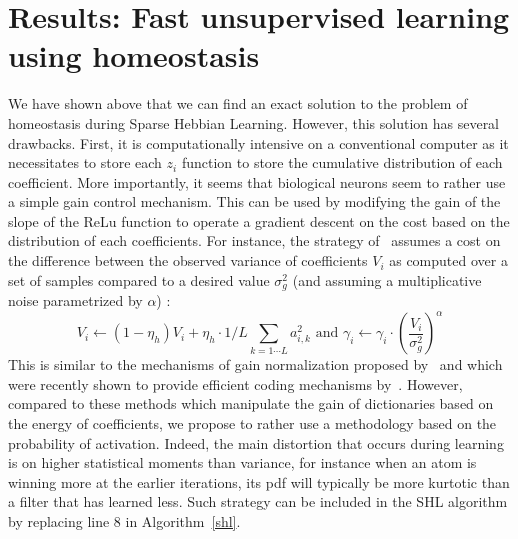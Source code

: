 \documentclass[draft]{article} %
\newcommand{\seeFig}[1]{Figure~\ref{fig:#1}}%
\begin{document}
\section{Results: Fast unsupervised learning using homeostasis}\label{results}
We have shown above that we can find an exact solution to the problem of homeostasis during Sparse Hebbian Learning. However, this solution has several drawbacks. First, it is computationally intensive on a conventional computer as it necessitates to store each $z_i$ function to store the cumulative distribution of each coefficient. More importantly, it seems that biological neurons seem to rather use a simple gain control mechanism. This can be used by modifying the gain of the slope of the ReLu function to operate a gradient descent on the cost based on the distribution of each coefficients. For instance, the strategy of~\citep{Olshausen97} assumes a cost on the difference between the observed variance of coefficients $V_i$ as computed over a set of samples compared to a desired value $\sigma_g^2$ (and assuming a multiplicative noise parametrized by $\alpha$) :
\begin{equation}%
V_i \leftarrow (1- \eta_h ) V_i + \eta_h \cdot 1/L\sum_{k=1\cdots L} a_{i, k}^2 \textrm{ and }
\gamma_i \leftarrow \gamma_i \cdot \left( \frac{V_i}{\sigma_g^2} \right)^\alpha
\end{equation}%
This is similar to the mechanisms of gain normalization proposed by~\citep{Schwartz01} and which were recently shown to provide efficient coding mechanisms by~\citep{Simoncelli17}. However, compared to these methods which manipulate the gain of dictionaries based on the energy of coefficients, we propose to rather use a methodology based on the probability of activation. Indeed, the main distortion that occurs during learning is on higher statistical moments than variance, for instance when an atom is winning more at the earlier iterations, its pdf will typically be more kurtotic than a filter that has learned less. Such strategy can be included in the SHL algorithm by replacing line 8 in Algorithm~\ref{shl}.
\end{document}
